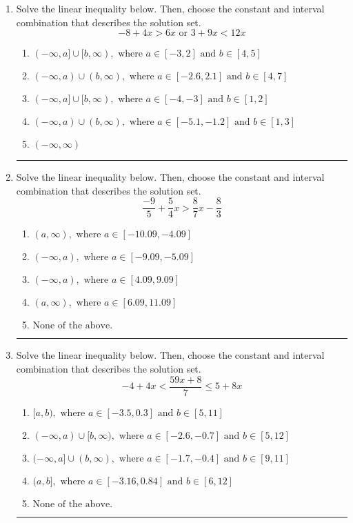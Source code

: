 \documentclass[14pt]{extbook}
\newcommand{\litem}[1]{\item#1\hspace*{-1cm}\rule{\textwidth}{0.4pt}}
\begin{document}
\begin{enumerate}
\litem{
Solve the linear inequality below. Then, choose the constant and interval combination that describes the solution set.\[ -8 + 4 x > 6 x \text{ or } 3 + 9 x < 12 x \]\begin{enumerate}[label=\Alph*.]
\item \( (-\infty, a] \cup [b, \infty), \text{ where } a \in [-3, 2] \text{ and } b \in [4, 5] \)
\item \( (-\infty, a) \cup (b, \infty), \text{ where } a \in [-2.6, 2.1] \text{ and } b \in [4, 7] \)
\item \( (-\infty, a] \cup [b, \infty), \text{ where } a \in [-4, -3] \text{ and } b \in [1, 2] \)
\item \( (-\infty, a) \cup (b, \infty), \text{ where } a \in [-5.1, -1.2] \text{ and } b \in [1, 3] \)
\item \( (-\infty, \infty) \)

\end{enumerate} }
\litem{
Solve the linear inequality below. Then, choose the constant and interval combination that describes the solution set.\[ \frac{-9}{5} + \frac{5}{4} x > \frac{8}{7} x - \frac{8}{3} \]\begin{enumerate}[label=\Alph*.]
\item \( (a, \infty), \text{ where } a \in [-10.09, -4.09] \)
\item \( (-\infty, a), \text{ where } a \in [-9.09, -5.09] \)
\item \( (-\infty, a), \text{ where } a \in [4.09, 9.09] \)
\item \( (a, \infty), \text{ where } a \in [6.09, 11.09] \)
\item \( \text{None of the above}. \)

\end{enumerate} }
\litem{
Solve the linear inequality below. Then, choose the constant and interval combination that describes the solution set.\[ -4 + 4 x < \frac{59 x + 8}{7} \leq 5 + 8 x \]\begin{enumerate}[label=\Alph*.]
\item \( [a, b), \text{ where } a \in [-3.5, 0.3] \text{ and } b \in [5, 11] \)
\item \( (-\infty, a) \cup [b, \infty), \text{ where } a \in [-2.6, -0.7] \text{ and } b \in [5, 12] \)
\item \( (-\infty, a] \cup (b, \infty), \text{ where } a \in [-1.7, -0.4] \text{ and } b \in [9, 11] \)
\item \( (a, b], \text{ where } a \in [-3.16, 0.84] \text{ and } b \in [6, 12] \)
\item \( \text{None of the above.} \)


\end{enumerate}}
\end{enumerate}
\end{document}
